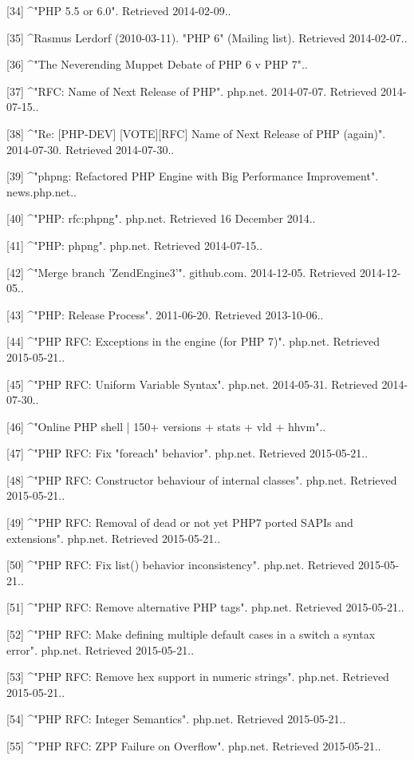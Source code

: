 [34]
^"PHP 5.5 or 6.0". Retrieved 2014-02-09..

[35]
^Rasmus Lerdorf (2010-03-11). "PHP 6" (Mailing list). Retrieved 2014-02-07..

[36]
^"The Neverending Muppet Debate of PHP 6 v PHP 7"..

[37]
^"RFC: Name of Next Release of PHP". php.net. 2014-07-07. Retrieved 2014-07-15..

[38]
^"Re: [PHP-DEV] [VOTE][RFC] Name of Next Release of PHP (again)". 2014-07-30. 
Retrieved 2014-07-30..

[39]
^"phpng: Refactored PHP Engine with Big Performance Improvement". news.php.net..

[40]
^"PHP: rfc:phpng". php.net. Retrieved 16 December 2014..

[41]
^"PHP: phpng". php.net. Retrieved 2014-07-15..

[42]
^"Merge branch 'ZendEngine3'". github.com. 2014-12-05. Retrieved 2014-12-05..

[43]
^"PHP: Release Process". 2011-06-20. Retrieved 2013-10-06..

[44]
^"PHP RFC: Exceptions in the engine (for PHP 7)". php.net. Retrieved 2015-05-21..

[45]
^"PHP RFC: Uniform Variable Syntax". php.net. 2014-05-31. Retrieved 2014-07-30..

[46]
^"Online PHP shell | 150+ versions + stats + vld + hhvm"..

[47]
^"PHP RFC: Fix "foreach" behavior". php.net. Retrieved 2015-05-21..

[48]
^"PHP RFC: Constructor behaviour of internal classes". php.net. Retrieved 2015-05-21..

[49]
^"PHP RFC: Removal of dead or not yet PHP7 ported SAPIs and extensions". php.net. Retrieved 2015-05-21..

[50]
^"PHP RFC: Fix list() behavior inconsistency". php.net. Retrieved 2015-05-21..

[51]
^"PHP RFC: Remove alternative PHP tags". php.net. Retrieved 2015-05-21..

[52]
^"PHP RFC: Make defining multiple default cases in a switch a syntax error". php.net. Retrieved 2015-05-21..

[53]
^"PHP RFC: Remove hex support in numeric strings". php.net. Retrieved 2015-05-21..

[54]
^"PHP RFC: Integer Semantics". php.net. Retrieved 2015-05-21..

[55]
^"PHP RFC: ZPP Failure on Overflow". php.net. Retrieved 2015-05-21..

